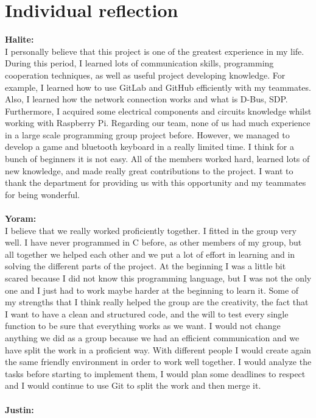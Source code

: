 \documentclass[a4paper]{article}
\begin{document}
\section{Individual reflection}
\textbf{Halite:}\\
I personally believe that this project is one of the greatest experience in my life. During this period, I learned lots of communication skills, programming cooperation techniques, as well as useful project developing knowledge. For example, I learned how to use GitLab and GitHub efficiently with my teammates. Also, I learned how the network connection works and what is D-Bus, SDP. Furthermore, I acquired some electrical components and circuits knowledge whilst working with Raspberry Pi. Regarding our team, none of us had much experience in a large scale programming group project before. However, we managed to develop a game and bluetooth keyboard in a really limited time. I think for a bunch of beginners it is not easy. All of the members worked hard, learned lots of new knowledge, and made really great contributions to the project. I want to thank the department for providing us with this opportunity and my teammates for being wonderful.
\\\\
\textbf{Yoram:}\\
I believe that we really worked proficiently together. I fitted in the group very well. I have never programmed in C before, as other members of my group, but all together we helped each other and we put a lot of effort in learning and in solving the different parts of the project. At the beginning I was a little bit scared because I did not know this programming language, but I was not the only one and I just had to work maybe harder at the beginning to learn it. Some of my strengths that I think really helped the group are the creativity, the fact that I want to have a clean and structured code, and the will to test every single function to be sure that everything works as we want.
I would not change anything we did as a group because we had an efficient communication and we have split the work in a proficient way. With different people I would create again the same friendly environment in order to work well together. I would analyze the tasks before starting to implement them, I would plan some deadlines to respect and I would continue to use Git to split the work and then merge it. 
\\\\
\textbf{Justin:}\\
\end{document}
